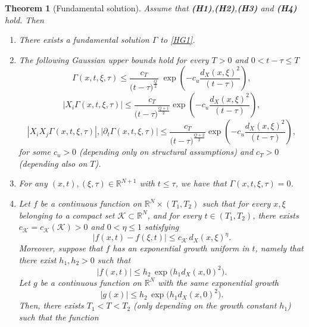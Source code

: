 \documentclass[11pt,a4paper]{article}
\newtheorem{theorem}{\bf Theorem}[section]
\numberwithin{equation}{section}
\def \rn {{\mathbb {R}}^{N}}
\def \rnn {{\mathbb {R}}^{N+1}}
\def \p {\partial}
\def \G {{\Gamma}}
\def \t {{\tau}}
\def \x {{\xi}}
\def \y {{\eta}}
\begin{document}
\begin{theorem}[Fundamental solution]\label{Th-Fundamental}
	Assume that \textbf{(H1)},\textbf{(H2)},\textbf{(H3)} and \textbf{(H4)} hold. Then
	\begin{enumerate}
		\item There exists a fundamental solution $\G$ to \eqref{HG1}.\label{item1}
		\item The following Gaussian upper bounds hold for every $T>0$ and $0<t-\tau\leq T$ 
		\begin{equation}\label{Gaussian-estimates}
			\G(x,t,\x,\t)\leq  \frac{c_T}{\big(t-\t\big)^{\frac{Q}{2}}} \;\exp{\left(-c_u\frac{d_X(x,\x)^2}{(t-\t)}\right)},
		\end{equation}
		\begin{equation}\label{Gaussian-estimates-1}
			|X_i\G(x,t,\x,\t)|\leq\frac{ c_T }{\big(t-\t\big)^{\frac{Q+1}{2}}}\exp{\left(-c_u\frac{d_X(x,\x)^2}{(t-\t)}\right)},
		\end{equation}
		\begin{equation}\label{Gaussian-estimates-2}
			|X_iX_j\G(x,t,\x,\t)|,|\p_t\G(x,t,\x,\t)|\leq \frac{ c_T }{\big(t-\t\big)^{\frac{Q+2}{2}}}\exp{\left(-c_u\frac{d_X(x,\x)^2}{(t-\t)}\right)},
		\end{equation}
		for some $c_u>0$ (depending only on structural assumptions) and $c_T>0$ (depending also on $T$). \label{item2}
		\item For any $(x,t),(\x,\t) \in \rnn$ with $t\leq \t$, we have that $\G(x,t,\x,\t)=0$. \label{item3}
		\item Let $f$ be a continuous function on $\rn \times (T_1,T_2)$ such that for every $x,\x$ belonging to a compact set $\mathcal K \subset  \rn$, and for every $t \in (T_1,T_2)$, there exists $c_\mathcal K=c_\mathcal K(\mathcal K)>0$ and $0<\y\leq 1$ satisfying
		\begin{equation}
			|f(x,t)-f(\x,t)|\leq c_\mathcal K\, d_X(x,\x)^\y.
		\end{equation}
		Moreover, suppose that $f$ has an exponential growth uniform in $t$, namely that there exist $h_1,h_2>0$ such that
		\begin{equation}\label{f-growth-exp}
			|f(x,t)|\leq h_2\,\exp\Big(h_1 d_X(x,0)^2\Big).
		\end{equation}
		Let $g$ be a continuous function on $\rn$ with the same exponential growth
		\begin{equation}\label{g-growth-exp}
			|g(x)|\leq h_2 \, \exp\Big(h_1 d_X(x,0)^2\Big).
		\end{equation}
		Then, there exists $T_1<T<T_2$ (only depending on the growth constant $h_1$) such that the function

\end{enumerate}
\end{theorem}
\end{document}
